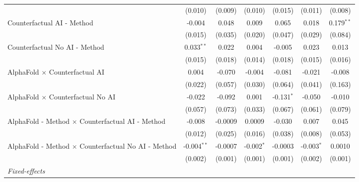 \begin{tabular}{lcccccc}
                                                              & (0.010)       & (0.009)       & (0.010)       & (0.015)       & (0.011)       & (0.008)\\   
   Counterfactual AI - Method                                 & -0.004        & 0.048         & 0.009         & 0.065         & 0.018         & 0.179$^{**}$\\   
                                                              & (0.015)       & (0.035)       & (0.020)       & (0.047)       & (0.029)       & (0.084)\\   
   Counterfactual No AI - Method                              & 0.033$^{**}$  & 0.022         & 0.004         & -0.005        & 0.023         & 0.013\\   
                                                              & (0.015)       & (0.018)       & (0.014)       & (0.018)       & (0.015)       & (0.016)\\   
   AlphaFold $\times$ Counterfactual AI                       & 0.004         & -0.070        & -0.004        & -0.081        & -0.021        & -0.008\\   
                                                              & (0.022)       & (0.057)       & (0.030)       & (0.064)       & (0.041)       & (0.163)\\   
   AlphaFold $\times$ Counterfactual No AI                    & -0.022        & -0.092        & 0.001         & -0.131$^{*}$  & -0.050        & -0.010\\   
                                                              & (0.057)       & (0.073)       & (0.033)       & (0.067)       & (0.061)       & (0.079)\\   
   AlphaFold - Method $\times$ Counterfactual AI - Method     & -0.008        & -0.0009       & 0.0009        & -0.030        & 0.007         & 0.045\\   
                                                              & (0.012)       & (0.025)       & (0.016)       & (0.038)       & (0.008)       & (0.053)\\   
   AlphaFold - Method $\times$ Counterfactual No AI - Method  & -0.004$^{**}$ & -0.0007       & -0.002$^{*}$  & -0.0003       & -0.003$^{*}$  & 0.0010\\   
                                                              & (0.002)       & (0.001)       & (0.001)       & (0.001)       & (0.002)       & (0.001)\\   
   \midrule
   \emph{Fixed-effects}\\

\end{tabular}
